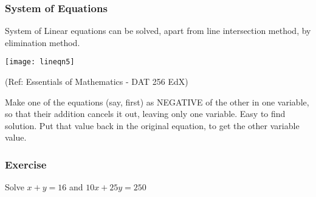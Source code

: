  \begin{frame}[fragile]\frametitle{System of Equations}
System of Linear equations can be solved, apart from line intersection method, by elimination method.
\begin{center}
\texttt{[image: lineqn5]}

{\tiny (Ref: Essentials of Mathematics - DAT 256 EdX)}
\end{center}
Make one of the equations (say, first) as NEGATIVE of the other in one variable, so that their addition cancels it out, leaving only one variable. Easy to find solution. Put that value back in the original equation, to get the other variable value.
\end{frame}

 \begin{frame}[fragile]\frametitle{Exercise}
Solve $x + y = 16$ and $10x + 25y = 250$
\end{frame}











